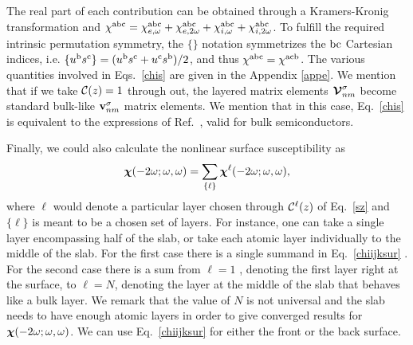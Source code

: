 \documentclass[floatfix,prb,aps,superscriptaddress,11pt,preprint,letterpaper]{revtex4}
\def\chon{black}
\begin{document}
The real part of each contribution can be obtained through
a Kramers-Kronig transformation\cite{tacongePRB14} {\color{\chon} and}
$\chi^{\mathrm{a}\mathrm{b}\mathrm{c}}=
\chi^{\mathrm{a}\mathrm{b}\mathrm{c}}_{e,\omega} 
+\chi^{\mathrm{a}\mathrm{b}\mathrm{c}}_{e,2\omega}
+\chi^{\mathrm{a}\mathrm{b}\mathrm{c}}_{i,\omega} 
+\chi^{\mathrm{a}\mathrm{b}\mathrm{c}}_{i,2\omega}
$.
To fulfill the required intrinsic permutation symmetry, %
the $\{\}$ notation symmetrizes the $\mathrm{b}\mathrm{c}$ Cartesian indices, i.e. 
$\{u^{\mathrm{b}}s^{\mathrm{c}}\}=(u^{\mathrm{b}}s^{\mathrm{c}}+u^{\mathrm{c}}s^{\mathrm{b}})/2$,
and thus
$\chi^{\mathrm{a}\mathrm{b}\mathrm{c}}=\chi^{\mathrm{a}\mathrm{c}\mathrm{b}}$.
The various quantities involved in Eqs.~\eqref{chis} are given in
the Appendix \ref{appe}. 
We mention that if we take ${\mathbf{\cal C}}(z)=1$ through out, the layered
matrix elements $\boldsymbol{\mathcal{\cal V}}^{\sigma}_{nm}$ become standard bulk-like
$\mathbf{v}^{\sigma}_{nm}$ matrix elements. We mention that in this
case, Eq.~\eqref{chis} is equivalent to the expressions of
Ref.~, valid for bulk semiconductors.
 
Finally, we could also calculate the nonlinear surface susceptibility as 
\begin{equation}\label{chiijksur}
\boldsymbol{\chi}(-2\omega;\omega,\omega)
= \sum_{\{\ell\}}\boldsymbol{\chi}^\ell(-2\omega;\omega,\omega),
\end{equation} 
where $\ell$ would denote a particular layer chosen through
${\mathbf{\cal C}}^\ell(z)$ of Eq.~\eqref{sz} and
$\{\ell\}$
is meant to be {\color{\chon} a chosen set of layers.} For instance, 
one {\color{\chon} can take a single layer 
encompassing} half of the slab, or {\color{\chon} take each 
atomic layer individually to the middle} 
of the slab. {\color{\chon} For} the first case there is 
{\color{\chon} a} single summand
in Eq.~\eqref{chiijksur}{\color{\chon} . For the second case
there is} a sum from $\ell=1${\color{\chon} , denoting the first layer 
right at the surface, to $\ell=N$, denoting the layer at the middle of the slab 
that behaves like a bulk layer.}
We {\color{\chon} remark} that the value of 
$N$ is not universal {\color{\chon} and} 
the slab needs to have enough atomic layers 
{\color{\chon} in} order to give converged results for 
$\boldsymbol{\chi} (-2\omega;\omega,\omega)$. 
We can use Eq.~\eqref{chiijksur} for 
either the front or the back surface. 
\cite{mejiaRMF04}
\end{document}
